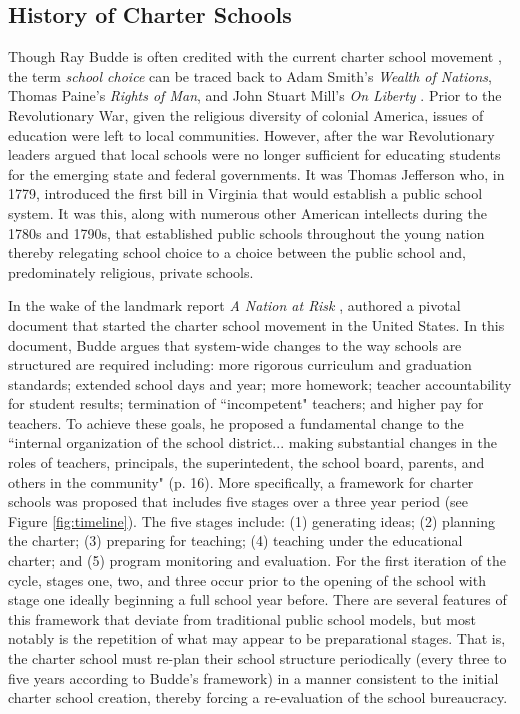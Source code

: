 \documentclass[letterpaper,12p,twoside]{article} %
\begin{document}
\subsection{History of Charter Schools}
Though Ray Budde is often credited with the current charter school movement \cite{kolderie05}, the term \textit{school choice} can be traced back to Adam Smith's \textit{Wealth of Nations}, Thomas Paine's \textit{Rights of Man}, and John Stuart Mill's \textit{On Liberty} \cite{herbst2006}. Prior to the Revolutionary War, given the religious diversity of colonial America, issues of education were left to local communities. However, after the war Revolutionary leaders argued that local schools were no longer sufficient for educating students for the emerging state and federal governments. It was Thomas Jefferson who, in 1779, introduced the first bill in Virginia that would establish a public school system. It was this, along with numerous other American intellects during the 1780s and 1790s, that established public schools throughout the young nation thereby relegating school choice to a choice between the public school and, predominately religious, private schools.

In the wake of the landmark report \textit{A Nation at Risk} \cite{nationatrisk},  authored a pivotal document that started the charter school movement in the United States. In this document, Budde argues that system-wide changes to the way schools are structured are required including: more rigorous curriculum and graduation standards; extended school days and year; more homework; teacher accountability for student results; termination of ``incompetent" teachers; and higher pay for teachers. To achieve these goals, he proposed a fundamental change to the ``internal organization of the school district... making substantial changes in the roles of teachers, principals, the superintedent, the school board, parents, and others in the community" (p. 16). More specifically, a framework for charter schools was proposed that includes five stages over a three year period (see Figure \ref{fig:timeline}). The five stages include: (1) generating ideas; (2) planning the charter; (3) preparing for teaching; (4) teaching under the educational charter; and (5) program monitoring and evaluation. For the first iteration of the cycle, stages one, two, and three occur prior to the opening of the school with stage one ideally beginning a full school year before. There are several features of this framework that deviate from traditional public school models, but most notably is the repetition of what may appear to be preparational stages. That is, the charter school must re-plan their school structure periodically (every three to five years according to Budde's framework) in a manner consistent to the initial charter school creation, thereby forcing a re-evaluation of the school bureaucracy.
\end{document}
